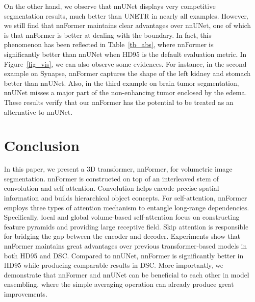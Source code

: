 \documentclass[journal,twoside,web]{ieeecolor}
\begin{document}
On the other hand, we observe that nnUNet displays very competitive segmentation results, much better than UNETR in nearly all examples. However, we still find that nnFormer maintains clear advantages over nnUNet, one of which is that nnFormer is better at dealing with the boundary. In fact, this phenomenon has been reflected in Table~\ref{tb_abs}, where nnFormer is significantly better than nnUNet when HD95 is the default evaluation metric. In Figure~\ref{fig_vis}, we can also observe some evidences. For instance, in the second example on Synapse, nnFormer captures the shape of the left kidney and stomach better than nnUNet. Also, in the third example on brain tumor segmentation, nnUNet misses a major part of the non-enhancing tumor enclosed by the edema. These results verify that our nnFormer has the potential to be treated as an alternative to nnUNet.

\section{Conclusion}
\label{sec:conclusion}
In this paper, we present a 3D transformer, nnFormer, for volumetric image segmentation. nnFormer is constructed on top of an interleaved stem of convolution and self-attention. Convolution helps encode precise spatial information and builds hierarchical object concepts. For self-attention, nnFormer employs three types of attention mechanism to entangle long-range dependencies. Specifically, local and global volume-based self-attention focus on constructing feature pyramids and providing large receptive field. Skip attention is responsible for bridging the gap between the encoder and decoder. Experiments show that nnFormer maintains great advantages over previous transformer-based models in both HD95 and DSC. Compared to nnUNet, nnFormer is significantly better in HD95 while producing comparable results in DSC. More importantly, we demonstrate that nnFormer and nnUNet can be beneficial to each other in model ensembling, where the simple averaging operation can already produce great improvements.



{


}
\end{document}
